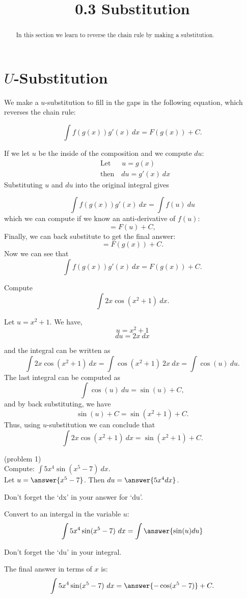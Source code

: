 \documentclass[handout]{ximera}
\title{0.3 Substitution}
\begin{document}
\begin{abstract}
In this section we learn to reverse the chain rule by making a substitution.
\end{abstract}

\maketitle

\section{$U$-Substitution}

We make a $u$-substitution to fill in the gaps in the following equation, which reverses the chain rule:

\[\int f(g(x))g'(x) \ dx = F(g(x)) + C. \]

If we let $u$ be the inside of the composition and we compute $du$:
 \begin{align*}
 &\text{Let} \quad \;\;u  = g(x) \\
 &\text{then} \quad du = g'(x) \ dx
 \end{align*}
 Substituting $u$ and $du$ into the original integral gives

\[\int f(g(x))g'(x) \ dx = \int f(u) \ du \]
which we can compute if we know an anti-derivative of $f(u)$:
\[=F(u) + C,\]
Finally, we can back substitute to get the final answer:
\[=F(g(x)) + C. \]
Now we can see that
\[\int f(g(x))g'(x) \ dx = F(g(x)) + C. \]



\begin{example}[example 1]
Compute 
\[\int 2x\cos(x^2 + 1) \ dx.\]

Let $u = x^2 + 1$.  We have,
\[u = x^2 + 1\]
\[du = 2x \ dx\]

and the integral can be written as 
\[\int 2x\cos(x^2 + 1) \ dx = \int \cos(x^2 + 1) \ 2x\  dx = \int \cos(u) \ du.\]
The last integral can be computed as 
\[\int \cos(u) \ du = \sin(u) + C,\]
and by back substituting, we have 
\[\sin(u) + C = \sin(x^2 + 1) + C.\]
Thus, using $u$-substitution we can conclude that
\[\int 2x\cos(x^2 + 1) \ dx =  \sin(x^2 + 1) + C.\]
\end{example}



\begin{problem}(problem 1)\\ Compute: $\displaystyle{\int 5x^4\sin(x^5 -7) \ dx}$.\\
Let $u = \answer{x^5 - 7}$. Then $du = \answer{5x^4 dx}$.\\
\begin{hint}
Don't forget the `dx' in your answer for `du'.
\end{hint}
Convert to an intergal in the variable $u$:
\[\int 5x^4\sin(x^5 -7) \ dx = \int\answer{\sin(u) du}\]
\begin{hint}
Don't forget the `du' in your integral.
\end{hint}
The final answer in terms of $x$ is:
\[\int 5x^4\sin(x^5 -7) \ dx = \answer{-\cos(x^5 -7)} +C.\]
\end{problem}
\end{document}
